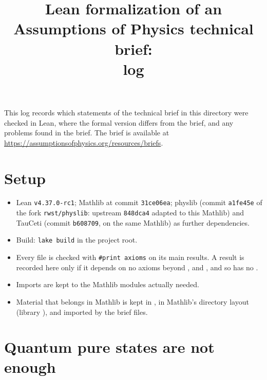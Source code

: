 \documentclass[11pt]{article}
\title{Lean formalization of an Assumptions of Physics technical brief:\\ log}
\author{}
\date{}
\begin{document}
\maketitle

\noindent
This log records which statements of the technical brief in this directory were checked in Lean,
where the formal version differs from the brief, and any problems found in the brief.
The brief is available at \url{https://assumptionsofphysics.org/resources/briefs}.

\section*{Setup}

\begin{itemize}
\item Lean \texttt{v4.37.0-rc1}; Mathlib at commit \texttt{31ce06ea}; physlib (commit \texttt{a1fe45e}
  of the fork \texttt{rwst/physlib}: upstream \texttt{848dca4} adapted to this Mathlib) and
  TauCeti (commit \texttt{b608709}, on the same Mathlib) as further dependencies.
\item Build: \texttt{lake build} in the project root.
\item Every file is checked with \texttt{\#print axioms} on its main results. A result is
  recorded here only if it depends on no axioms beyond ,
   and , and so has no .
\item Imports are kept to the Mathlib modules actually needed.
\item Material that belongs in Mathlib is kept in , in Mathlib's directory
  layout (library ), and imported by the brief files.
\end{itemize}



\section{Quantum pure states are not enough}
\end{document}
